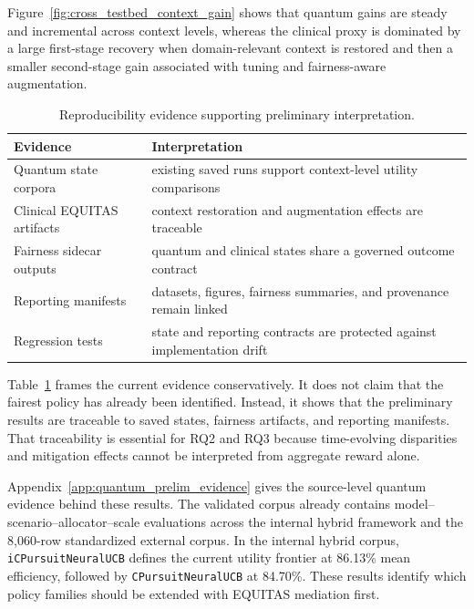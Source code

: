 \documentclass[conference]{IEEEtran}
\begin{document}
Figure~\ref{fig:cross_testbed_context_gain} shows that quantum gains are steady and incremental across context levels, whereas the clinical proxy is dominated by a large first-stage recovery when domain-relevant context is restored and then a smaller second-stage gain associated with tuning and fairness-aware augmentation.

\begin{table}[t]
\caption{Reproducibility evidence supporting preliminary interpretation.}
\label{tab:validation}
\centering
\small
\begin{tabular}{p{}p{}}
\toprule
\textbf{Evidence} & \textbf{Interpretation} \\
\midrule
Quantum state corpora & existing saved runs support context-level utility comparisons \\
Clinical EQUITAS artifacts & context restoration and augmentation effects are traceable \\
Fairness sidecar outputs & quantum and clinical states share a governed outcome contract \\
Reporting manifests & datasets, figures, fairness summaries, and provenance remain linked \\
Regression tests & state and reporting contracts are protected against implementation drift \\
\bottomrule
\end{tabular}
\end{table}

Table~\ref{tab:validation} frames the current evidence conservatively. It does
not claim that the fairest policy has already been identified. Instead, it
shows that the preliminary results are traceable to saved states, fairness
artifacts, and reporting manifests. That traceability is essential for RQ2 and
RQ3 because time-evolving disparities and mitigation effects cannot be
interpreted from aggregate reward alone.

Appendix~\ref{app:quantum_prelim_evidence} gives the source-level quantum
evidence behind these results. The validated corpus already contains
model--scenario--allocator--scale evaluations across the internal hybrid
framework and the 8,060-row standardized external corpus. In the internal
hybrid corpus, \texttt{iCPursuitNeuralUCB} defines the current utility
frontier at 86.13\% mean efficiency, followed by
\texttt{CPursuitNeuralUCB} at 84.70\%. These results identify which policy
families should be extended with EQUITAS mediation first.
\end{document}
